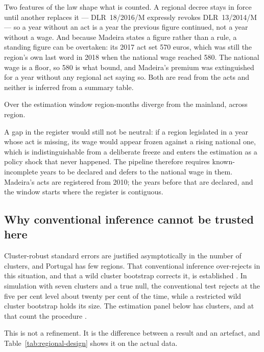 Two features of the law shape what is counted. A regional decree stays in force
until another replaces it --- DLR~18/2016/M expressly revokes DLR~13/2014/M ---
so a year without an act is a year the previous figure continued, not a year
without a wage. And because Madeira states a figure rather than a rule, a
standing figure can be overtaken: its 2017 act set 570 euros, which was still
the region's own last word in 2018 when the national wage reached 580. The
national wage is a floor, so 580 is what bound, and Madeira's premium was
extinguished for a year without any regional act saying so. Both are read from
the acts and neither is inferred from a summary table.

Over the estimation window \IdentifyingEvents{} region-months diverge from the
mainland, across \IdentifyingRegions{} region.

A gap in the register would still not be neutral: if a region legislated in a
year whose act is missing, its wage would appear frozen against a rising
national one, which is indistinguishable from a deliberate freeze and enters the
estimation as a policy shock that never happened. The pipeline therefore
requires known-incomplete years to be declared and defers to the national wage
in them. Madeira's acts are registered from 2010; the years before that are
declared, and the window starts where the register is contiguous.

\subsection{Why conventional inference cannot be trusted here}

Cluster-robust standard errors are justified asymptotically in the number of
clusters, and Portugal has few regions. That conventional inference over-rejects
in this situation, and that a wild cluster bootstrap corrects it, is established
\citep{cameron2008bootstrap}. In simulation with seven clusters and a
true null, the conventional test rejects at the five per cent level about twenty
per cent of the time, while a restricted wild cluster bootstrap holds its size.
The estimation panel below has \BootstrapClusters{} clusters, and at that count
the procedure \BootstrapBasis{}.

This is not a refinement. It is the difference between a result and an artefact,
and Table~\ref{tab:regional-design} shows it on the actual data.

\begin{table}[htbp]
  \centering
  \caption{Cumulative price response to the statutory change, regional design.
  Estimated over the window in which Madeira's register is contiguous, with
  region-category and calendar-time fixed effects, clustered on region. The
  interval is obtained by inverting the bootstrap test rather than from the
  standard error, so it and the $p$-value beside it are the same procedure read
  two ways; an asterisk would mark an interval whose search did not close, and
  \IntervalsBounded{} of these closed.}
  \label{tab:regional-design}
  
\end{table}

